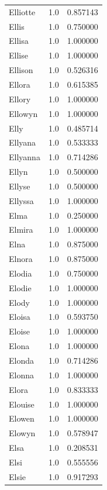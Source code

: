 \documentclass[
  letterpaper,
  DIV=11,
  numbers=noendperiod]{scrreprt}
\begin{document}
\begin{tabular}{lrr}
Elliotte        &   1.0 &   0.857143 \\
Ellis           &   1.0 &   0.750000 \\
Ellisa          &   1.0 &   1.000000 \\
Ellise          &   1.0 &   1.000000 \\
Ellison         &   1.0 &   0.526316 \\
Ellora          &   1.0 &   0.615385 \\
Ellory          &   1.0 &   1.000000 \\
Ellowyn         &   1.0 &   1.000000 \\
Elly            &   1.0 &   0.485714 \\
Ellyana         &   1.0 &   0.533333 \\
Ellyanna        &   1.0 &   0.714286 \\
Ellyn           &   1.0 &   0.500000 \\
Ellyse          &   1.0 &   0.500000 \\
Ellyssa         &   1.0 &   1.000000 \\
Elma            &   1.0 &   0.250000 \\
Elmira          &   1.0 &   1.000000 \\
Elna            &   1.0 &   0.875000 \\
Elnora          &   1.0 &   0.875000 \\
Elodia          &   1.0 &   0.750000 \\
Elodie          &   1.0 &   1.000000 \\
Elody           &   1.0 &   1.000000 \\
Eloisa          &   1.0 &   0.593750 \\
Eloise          &   1.0 &   1.000000 \\
Elona           &   1.0 &   1.000000 \\
Elonda          &   1.0 &   0.714286 \\
Elonna          &   1.0 &   1.000000 \\
Elora           &   1.0 &   0.833333 \\
Elouise         &   1.0 &   1.000000 \\
Elowen          &   1.0 &   1.000000 \\
Elowyn          &   1.0 &   0.578947 \\
Elsa            &   1.0 &   0.208531 \\
Elsi            &   1.0 &   0.555556 \\
Elsie           &   1.0 &   0.917293 \\

\end{tabular}
\end{document}
